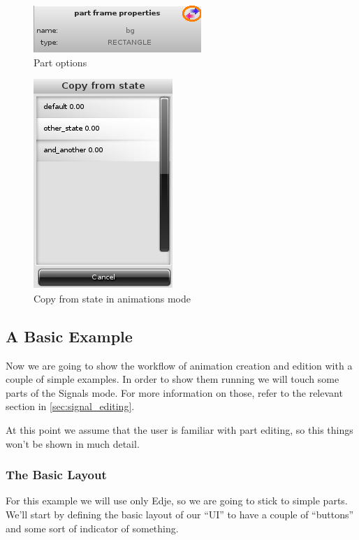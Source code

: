 \documentclass[a4paper]{profusion}
\begin{document}
\begin{figure}[h!]
  \centering
  \includegraphics{images/animation_part_options.png}
  \caption{Part options}
  \label{fig:animation_part_options}
\end{figure}

\begin{figure}[h!]
  \centering
  \includegraphics{images/animation_states_popup.png}
  \caption{Copy from state in animations mode}
  \label{fig:animation_states_popup}
\end{figure}

\subsection{A Basic Example}

Now we are going to show the workflow of animation creation and edition
with a couple of simple examples. In order to show them running we will
touch some parts of the Signals mode. For more information on those,
refer to the relevant section in \ref{sec:signal_editing}.

At this point we assume that the user is familiar with part editing, so
this things won't be shown in much detail.

\subsubsection{The Basic Layout}

For this example we will use only Edje, so we are going to stick to simple
parts. We'll start by defining the basic layout of our ``UI'' to have a
couple of ``buttons'' and some sort of indicator of something.
\end{document}
